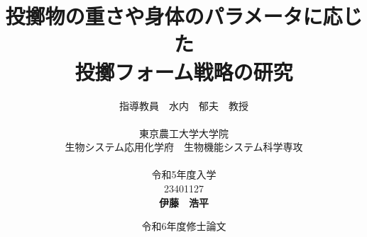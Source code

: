 


\usepackage{ikuo}%

\usepackage[dvipdfmx]{hyperref}  %
\usepackage{pxjahyper} %
\hypersetup{colorlinks=true}
\hypersetup{linkcolor=black}
\hypersetup{urlcolor=black}
\hypersetup{citecolor=black}

\usepackage{url} %


\newcommand{\FIGDIR}{./fig}        %
\usepackage{otf}


\usepackage[hang,small,bf]{caption}

\date{令和6年度修士論文}
\title{投擲物の重さや身体のパラメータに応じた\\投擲フォーム戦略の研究}
\author{指導教員　水内　郁夫　教授 \\
\ \\
東京農工大学大学院　\\
生物システム応用化学府　生物機能システム科学専攻　\\
\ \\
令和5年度入学\\
23401127\\
{\bf 伊藤　浩平}}


\setlength{\baselineskip}{20pt}
\maketitle
\tableofcontents







% 







